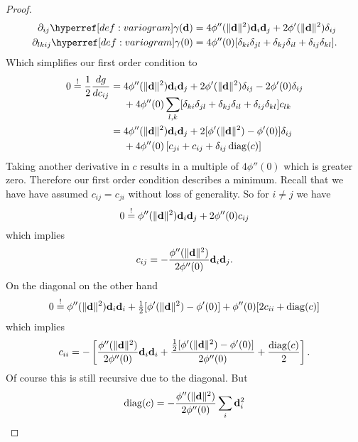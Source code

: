 \begin{proof}
\begin{align*}
		\partial_{ij}\variogram(\step)
		&= 4\phi''(\|\step\|^2)\step_i\step_j + 2\phi'(\|\step\|^2)\delta_{ij}\\
		\partial_{lkij}\variogram(0)
		&=4\phi''(0)[\delta_{ki}\delta_{jl} + \delta_{kj}\delta_{il} + \delta_{ij}\delta_{kl}].
	\end{align*}
	Which simplifies our first order condition to
	\begin{align*}
		0 \overset!= \frac12\frac{dg}{dc_{ij}}
		&= \begin{aligned}[t]
			&4\phi''(\|\mathbf{d}\|^2)\mathbf{d}_i\mathbf{d}_j + 2\phi'(\|\mathbf{d}\|^2)\delta_{ij}
			- 2\phi'(0)\delta_{ij}\\
			&+ 4\phi''(0)\sum_{l,k}[\delta_{ki}\delta_{jl} + \delta_{kj}\delta_{il} + \delta_{ij}\delta_{kl}]c_{lk}
		\end{aligned}\\
		&= \begin{aligned}[t]
			&4\phi''(\|\mathbf{d}\|^2)\mathbf{d}_i\mathbf{d}_j + 2[\phi'(\|\mathbf{d}\|^2)-\phi'(0)]\delta_{ij}\\
			&+ 4\phi''(0)\left[c_{ji} + c_{ij} + \delta_{ij}\operatorname{diag}(c)\right]
		\end{aligned}
	\end{align*}
	Taking another derivative in \(c\) results in a multiple of \(4\phi''(0)\)
	which is greater zero. Therefore our first order condition describes a
	minimum. Recall that we have have assumed \(c_{ij} = c_{ji}\) without
	loss of generality. So for \(i\neq j\) we have
	\begin{equation*}
		0\overset!= \phi''(\|\mathbf{d}\|^2)\mathbf{d}_i\mathbf{d}_j + 2\phi''(0)c_{ij}
	\end{equation*}
	which implies
	\begin{equation*}
		c_{ij} = - \frac{\phi''(\|\mathbf{d}\|^2)}{2\phi''(0)}\mathbf{d}_i\mathbf{d}_j.
	\end{equation*}
	On the diagonal on the other hand
	\begin{equation*}
		0\overset!= \phi''(\|\mathbf{d}\|^2)\mathbf{d}_i\mathbf{d}_i + \tfrac12[\phi'(\|\mathbf{d}\|^2)-\phi'(0)]
		+ \phi''(0)[2c_{ii} + \operatorname{diag}(c)]
	\end{equation*}
	which implies
	\begin{equation*}
		c_{ii} = -\left[
			\frac{\phi''(\|\mathbf{d}\|^2)}{2\phi''(0)}\mathbf{d}_i\mathbf{d}_i
			+ \frac{\tfrac12[\phi'(\|\mathbf{d}\|^2)-\phi'(0)]}{2\phi''(0)}
			+ \frac{\operatorname{diag}(c)}{2}
		\right].
	\end{equation*}
	Of course this is still recursive due to the diagonal. But	
	\begin{equation*}
		\diag(c)
		= - \frac{\phi''(\|\step\|^2)}{2\phi''(0)}\sum_{i}\step_i^2

\end{equation*}
\end{proof}
